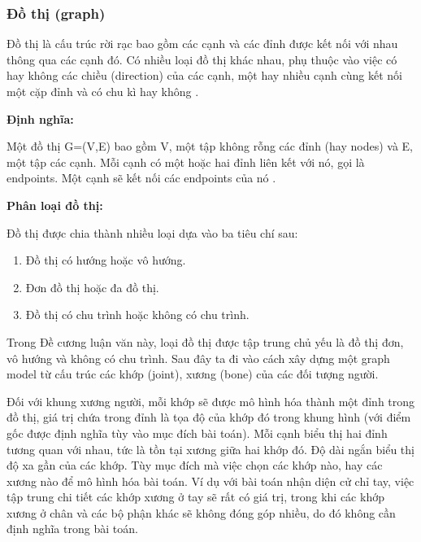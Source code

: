 
\subsubsection{Đồ thị (graph)}

Đồ thị là cấu trúc rời rạc bao gồm các cạnh và các đỉnh được kết nối với nhau thông qua các cạnh đó. Có nhiều loại đồ thị khác nhau, phụ thuộc vào việc có hay không các chiều (direction) của các cạnh, một hay nhiều cạnh cùng kết nối một cặp đỉnh và có chu kì hay không \cite{rosen2012discrete}. 

\textbf{Định nghĩa:}

Một đồ thị G=(V,E) bao gồm V, một tập không rỗng các đỉnh (hay nodes) và E, một tập các cạnh. Mỗi cạnh có một hoặc hai đỉnh liên kết với nó, gọi là endpoints. Một cạnh sẽ kết nối các endpoints của nó \cite{rosen2012discrete}. 

\textbf{Phân loại đồ thị:}

Đồ thị được chia thành nhiều loại dựa vào ba tiêu chí sau:
\begin{enumerate}
\item Đồ thị có hướng hoặc vô hướng.
\item Đơn đồ thị hoặc đa đồ thị.
\item Đồ thị có chu trình hoặc không có chu trình.
\end{enumerate}

Trong Đề cương luận văn này, loại đồ thị được tập trung chủ yếu là đồ thị đơn, vô hướng và không có chu trình. Sau đây ta đi vào cách xây dựng một graph model từ cấu trúc các khớp (joint), xương (bone) của các đối tượng người.

Đối với khung xương người, mỗi khớp sẽ được mô hình hóa thành một đỉnh trong đồ thị, giá trị chứa trong đỉnh là tọa độ của khớp đó trong khung hình (với điểm gốc được định nghĩa tùy vào mục đích bài toán). Mỗi cạnh biểu thị hai đỉnh tương quan với nhau, tức là tồn tại xương giữa hai khớp đó. Độ dài ngắn biểu thị độ xa gần của các khớp. Tùy mục đích mà việc chọn các khớp nào,  hay các xương nào để  mô hình hóa bài toán. Ví dụ với bài toán nhận diện cử chỉ tay, việc tập trung chi tiết các khớp xương ở tay sẽ rất có giá trị, trong khi các khớp xương ở chân và các bộ phận khác sẽ không đóng góp nhiều, do đó không cần định nghĩa trong bài toán.

